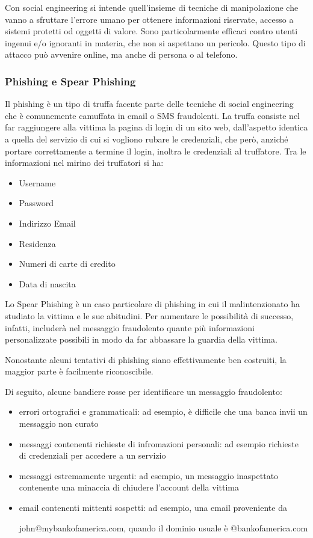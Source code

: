 Con social engineering si intende quell'insieme di tecniche di manipolazione che vanno a sfruttare l'errore umano per ottenere informazioni riservate, accesso a sistemi protetti od oggetti di valore. Sono particolarmente efficaci contro utenti ingenui e/o ignoranti in materia, che non si aspettano un pericolo. Questo tipo di attacco può avvenire online, ma anche di persona o al telefono.

\subsubsection{Phishing e Spear Phishing}

Il phishing è un tipo di truffa facente parte delle tecniche di social engineering che è comunemente camuffata in email o SMS fraudolenti. La truffa consiste nel far raggiungere alla vittima la pagina di login di un sito web, dall'aspetto identica a quella del servizio di cui si vogliono rubare le credenziali, che però, anziché portare correttamente a termine il login, inoltra le credenziali al truffatore.
Tra le informazioni nel mirino dei truffatori si ha:
\begin{itemize}
    \item Username
    \item Password
    \item Indirizzo Email
    \item Residenza
    \item Numeri di carte di credito
    \item Data di nascita
\end{itemize}

Lo Spear Phishing è un caso particolare di phishing in cui il malintenzionato ha studiato la vittima e le sue abitudini. Per aumentare le possibilità di successo, infatti, includerà nel messaggio fraudolento quante più informazioni personalizzate possibili in modo da far abbassare la guardia della vittima.

Nonostante alcuni tentativi di phishing siano effettivamente ben costruiti, la maggior parte è facilmente riconoscibile.

Di seguito, alcune bandiere rosse per identificare un messaggio fraudolento:

\begin{itemize}
    \item errori ortografici e grammaticali: ad esempio, è difficile che una banca invii un messaggio non curato
    \item messaggi contenenti richieste di infromazioni personali: ad esempio richieste di credenziali per accedere a un servizio
    \item messaggi estremamente urgenti: ad esempio, un messaggio inaspettato contenente una minaccia di chiudere l'account della vittima
    \item email contenenti mittenti sospetti: ad esempio, una email proveniente da

          john@mybankofamerica.com, quando il dominio usuale è @bankofamerica.com
\end{itemize}

